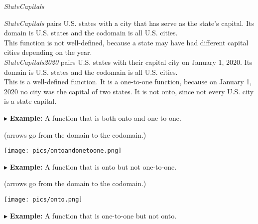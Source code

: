 \documentclass{ximera}
\begin{document}
\begin{example} \textit{StateCapitals}


\textit{StateCapitals} pairs U.S. states with a city that has serve as the state's capital. Its domain is U.S. states and the codomain is all U.S. cities.\\



This function is not well-defined, because a state may have had different capital cities depending on the year. \\


\textit{StateCapitals2020} pairs U.S. states with their capital city on January 1, 2020. Its domain is U.S. states and the codomain is all U.S. cities.\\


This is a well-defined function.  It is a one-to-one function, because on January 1, 2020 no city was the capital of two states.  It is not onto, since not every U.S. city is a state capital.


\end{example}












$\blacktriangleright$ \textbf{Example:} A function that is both onto and one-to-one.  \\

\begin{center}
(arrows go from the domain to the codomain.)
\begin{image}
\texttt{[image: pics/ontoandonetoone.png]}
\end{image}
\end{center}






$\blacktriangleright$ \textbf{Example:} A function that is onto but not one-to-one.  \\

\begin{center}
(arrows go from the domain to the codomain.)
\begin{image}
\texttt{[image: pics/onto.png]}
\end{image}
\end{center}







$\blacktriangleright$ \textbf{Example:} A function that is one-to-one but not onto.  \\
\end{document}
